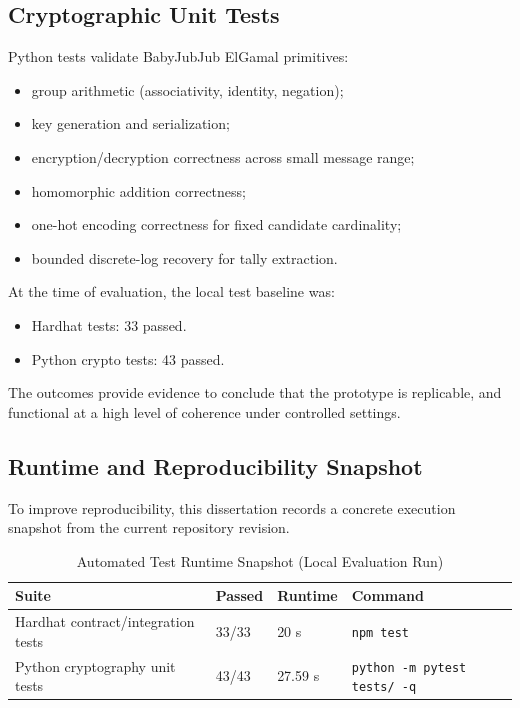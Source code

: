 \subsection{Cryptographic Unit Tests}

Python tests validate BabyJubJub ElGamal primitives:
\begin{itemize}
    \item group arithmetic (associativity, identity, negation);
    \item key generation and serialization;
    \item encryption/decryption correctness across small message range;
    \item homomorphic addition correctness;
    \item one-hot encoding correctness for fixed candidate cardinality;
    \item bounded discrete-log recovery for tally extraction.
\end{itemize}

At the time of evaluation, the local test baseline was:
\begin{itemize}
    \item Hardhat tests: 33 passed.
    \item Python crypto tests: 43 passed.
\end{itemize}

The outcomes provide evidence to conclude that the prototype is replicable, and functional at a high level of coherence under controlled settings.

\subsection{Runtime and Reproducibility Snapshot}

To improve reproducibility, this dissertation records a concrete execution snapshot from the current repository revision.

\begin{table}[htbp]
\centering
\small
\caption{Automated Test Runtime Snapshot (Local Evaluation Run)}
\label{tab:runtime-snapshot}
\begin{tabular}{L{2.8cm} L{1.8cm} L{2.0cm} L{5.5cm}}
\toprule
Suite & Passed & Runtime & Command \\ 
\midrule
Hardhat contract/integration tests & 33/33 & 20 s & \texttt{npm test} \\
Python cryptography unit tests & 43/43 & 27.59 s & \texttt{python -m pytest tests/ -q} \\ 
\bottomrule
\end{tabular}
\end{table}

